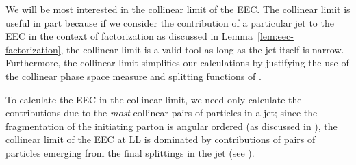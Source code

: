 We will be most interested in the collinear limit of the EEC.
%
The collinear limit is useful in part because if we consider the contribution of a particular jet to the EEC in the context of factorization as discussed in Lemma~\ref{lem:eec-factorization}, the collinear limit is a valid tool as long as the jet itself is narrow.
%
Furthermore, the collinear limit simplifies our calculations by justifying the use of the collinear phase space measure and splitting functions of .


To calculate the EEC in the collinear limit, we need only calculate the contributions due to the \emph{most} collinear pairs of particles in a jet;
%
since the fragmentation of the initiating parton is angular ordered (as discussed in ), the collinear limit of the EEC at LL is dominated by contributions of pairs of particles emerging from the final splittings in the jet (see ).

